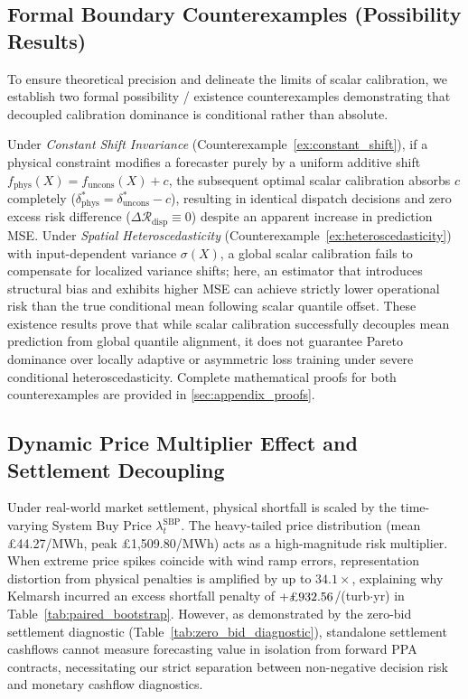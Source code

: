 \subsection{Formal Boundary Counterexamples (Possibility Results)}
To ensure theoretical precision and delineate the limits of scalar calibration, we establish two formal possibility / existence counterexamples demonstrating that decoupled calibration dominance is conditional rather than absolute.

Under \textit{Constant Shift Invariance} (Counterexample~\ref{ex:constant_shift}), if a physical constraint modifies a forecaster purely by a uniform additive shift $f_{\text{phys}}(X) = f_{\text{uncons}}(X) + c$, the subsequent optimal scalar calibration absorbs $c$ completely ($\delta_{\text{phys}}^* = \delta_{\text{uncons}}^* - c$), resulting in identical dispatch decisions and zero excess risk difference ($\Delta \mathcal{R}_{\text{disp}} \equiv 0$) despite an apparent increase in prediction MSE. Under \textit{Spatial Heteroscedasticity} (Counterexample~\ref{ex:heteroscedasticity}) with input-dependent variance $\sigma(X)$, a global scalar calibration fails to compensate for localized variance shifts; here, an estimator that introduces structural bias and exhibits higher MSE can achieve strictly lower operational risk than the true conditional mean following scalar quantile offset. These existence results prove that while scalar calibration successfully decouples mean prediction from global quantile alignment, it does not guarantee Pareto dominance over locally adaptive or asymmetric loss training under severe conditional heteroscedasticity. Complete mathematical proofs for both counterexamples are provided in \ref{sec:appendix_proofs}.

\subsection{Dynamic Price Multiplier Effect and Settlement Decoupling}
Under real-world market settlement, physical shortfall is scaled by the time-varying System Buy Price $\lambda_t^{\text{SBP}}$. The heavy-tailed price distribution (mean \pounds 44.27/MWh, peak \pounds 1,509.80/MWh) acts as a high-magnitude risk multiplier. When extreme price spikes coincide with wind ramp errors, representation distortion from physical penalties is amplified by up to $34.1\times$, explaining why Kelmarsh incurred an excess shortfall penalty of $+\text{\pounds} 932.56$/(turb$\cdot$yr) in Table~\ref{tab:paired_bootstrap}. However, as demonstrated by the zero-bid settlement diagnostic (Table~\ref{tab:zero_bid_diagnostic}), standalone settlement cashflows cannot measure forecasting value in isolation from forward PPA contracts, necessitating our strict separation between non-negative decision risk and monetary cashflow diagnostics.

